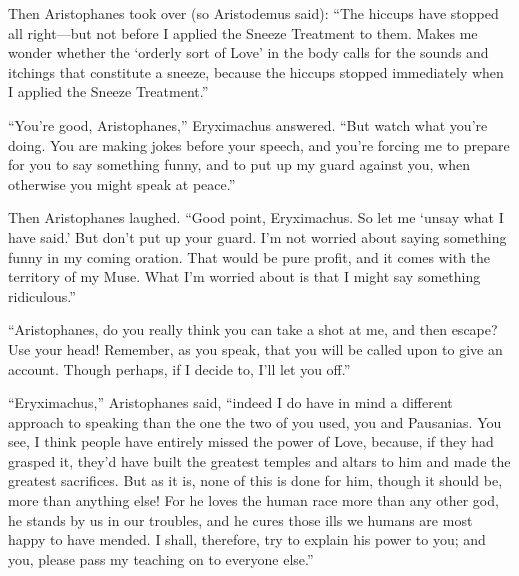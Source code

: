 \blank[line]

Then Aristophanes took over (so Aristodemus said): “The hiccups have
stopped all right---but not before I applied the Sneeze Treatment to
them. Makes me wonder whether the ‘orderly sort of Love' in the body
calls for the sounds and itchings that constitute a sneeze, because the
hiccups stopped immediately when I applied the Sneeze Treatment.”

“You're good, Aristophanes,” Eryximachus answered. “But watch what
you're doing. You are making jokes before your speech, and you're
forcing me to prepare for you to say something funny, and to put up my
guard  against you, when otherwise you might speak at peace.”

Then Aristophanes laughed. “Good point, Eryximachus. So let me ‘unsay
what I have said.' But don't put up your guard. I'm not worried about
saying something funny in my coming oration. That would be pure profit,
and it comes with the territory of my Muse. What I'm worried about is
that I might say something ridiculous.”

“Aristophanes, do you really think you can take a shot at me, and then
escape? Use your head! Remember, as you speak, that you will be called
 upon to give an account. Though perhaps, if I decide to, I'll
let you off.”

“Eryximachus,” Aristophanes said, “indeed I do have in mind a different
approach to speaking than the one the two of you used, you and
Pausanias. You see, I think people have entirely missed the power of
Love, because, if they had grasped it, they'd have built the greatest
temples and altars to him and made the greatest sacrifices. But as it
is, none of this is done for him, though it should be, more than
anything else! For he loves the human  race more than any other
god, he stands by us in our troubles, and he cures those ills we humans
are most happy to have mended. I shall, therefore, try to explain his
power to you; and you, please pass my teaching on to everyone
else.”

\blank[line]

